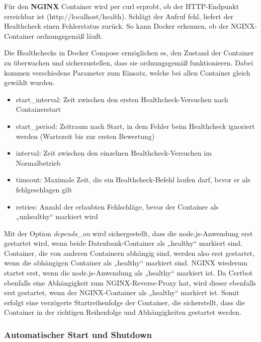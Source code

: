 Für den \textbf{NGINX} Container wird per curl erprobt, ob der HTTP-Endpunkt erreichbar ist (http://localhost/health).
Schlägt der Aufruf fehl, liefert der Healthcheck einen Fehlerstatus zurück.
So kann Docker erkennen, ob der NGINX-Container ordnungsgemäß läuft.

Die Healthchecks in Docker Compose ermöglichen es, den Zustand der Container zu überwachen und sicherzustellen, dass sie ordnungsgemäß funktionieren.
Dabei kommen verschiedene Parameter zum Einsatz, welche bei allen Container gleich gewählt wurden.
\begin{itemize}
    \item start\_interval: Zeit zwischen den ersten Healthcheck-Versuchen nach Containerstart
    \item start\_period: Zeitraum nach Start, in dem Fehler beim Healthcheck ignoriert werden (Wartezeit bis zur ersten Bewertung)
    \item interval: Zeit zwischen den einzelnen Healthcheck-Versuchen im Normalbetrieb
    \item timeout: Maximale Zeit, die ein Healthcheck-Befehl laufen darf, bevor er als fehlgeschlagen gilt
    \item retries: Anzahl der erlaubten Fehlschläge, bevor der Container als „unhealthy“ markiert wird
\end{itemize}

Mit der Option \textit{depends\_on} wird sichergestellt, dass die node.js-Anwendung erst gestartet wird, wenn beide Datenbank-Container als „healthy“ markiert sind.
Container, die von anderen Containern abhängig sind, werden also erst gestartet, wenn die abhängigen Container als „healthy“ markiert sind.
NGINX wiederum startet erst, wenn die node.js-Anwendung als „healthy“ markiert ist.
Da Certbot ebenfalls eine Abhängigkeit zum NGINX-Reverse-Proxy hat, wird dieser ebenfalls erst gestartet, wenn der NGINX-Container als „healthy“ markiert ist.
Somit erfolgt eine verzögerte Startreihenfolge der Container, die sicherstellt, dass die Container in der richtigen Reihenfolge und Abhängigkeiten gestartet werden.

\subsubsection{Automatischer Start und Shutdown}\label{subsubsec:vserver-docker-auto-start}

